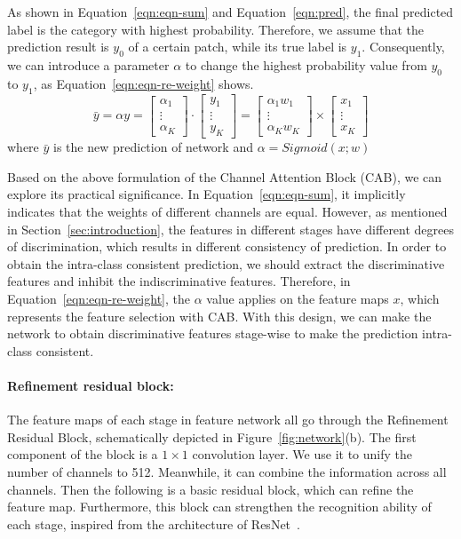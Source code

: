\documentclass[10pt,twocolumn,letterpaper]{article}
\begin{document}
As shown in Equation~\ref{eqn:eqn-sum} and Equation~\ref{eqn:pred}, the final predicted label is the category with highest probability. Therefore, we assume that the prediction result is $y_0$ of a certain patch, while its true label is $y_1$. Consequently, we can introduce a parameter $\alpha$ to change the highest probability value from $y_0$ to $y_1$, as Equation~\ref{eqn:eqn-re-weight} shows.  
\begin{equation}
\label{eqn:eqn-re-weight}
\bar{y} = \alpha y = \begin{bmatrix}\alpha_1 \\ \vdots \\ \alpha_K \end{bmatrix} \cdot \begin{bmatrix}y_1 \\ \vdots \\ y_K \end{bmatrix}=\begin{bmatrix}\alpha_1 w_1 \\ \vdots \\ \alpha_K w_K \end{bmatrix} \times \begin{bmatrix}x_1 \\ \vdots \\ x_K \end{bmatrix}
\end{equation}
where $\bar{y}$ is the new prediction of network and $\alpha = Sigmoid(x;w)$

Based on the above formulation of the Channel Attention Block (CAB), we can explore its practical significance. In Equation~\ref{eqn:eqn-sum}, it implicitly indicates that the weights of different channels are equal. However, as mentioned in Section~\ref{sec:introduction}, the features in different stages have different degrees of discrimination, which results in different consistency of prediction. In order to obtain the intra-class consistent prediction, we should extract the discriminative features and inhibit the indiscriminative features. Therefore, in Equation~\ref{eqn:eqn-re-weight}, the $\alpha$ value applies on the feature maps $x$, which represents the feature selection with CAB. With this design, we can make the network to obtain discriminative features stage-wise  to make the prediction intra-class consistent.

\vspace{-2ex}    
\paragraph{Refinement residual block:} The feature maps of each stage in feature network all go through the Refinement Residual Block, schematically depicted in Figure~\ref{fig:network}(b). The first component of the block is a $1 \times 1$ convolution layer. We use it to unify the number of channels to 512. Meanwhile, it can combine the information across all channels. Then the following is a basic residual block, which can refine the feature map. Furthermore, this block can strengthen the recognition ability of each stage, inspired from the architecture of ResNet~\cite{He-CVPR-ResNet-2016, He-ECCV-Identity-2016}. 
	
\end{document}

